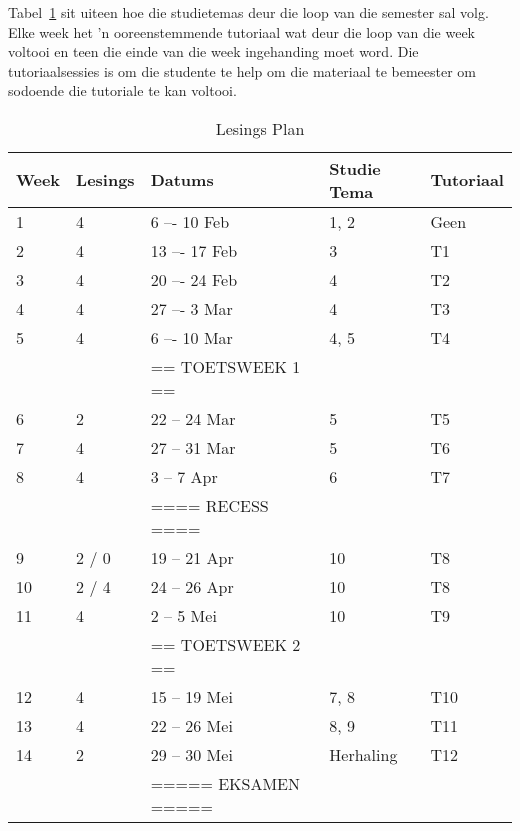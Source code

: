         Tabel~\ref{tab:lec_plan} sit uiteen hoe die studietemas deur die loop
        van die semester sal volg.  Elke week het 'n ooreenstemmende tutoriaal
        wat deur die loop van die week voltooi en teen die	einde van die week
        ingehanding moet word. Die tutoriaalsessies is om die studente te help
        om die materiaal te bemeester om sodoende die tutoriale te kan voltooi.

        \begin{table}[!h]
            \begin{center}
             \begin{tabular}{|l|l|l|l|l|}
                 \hline
                 {\bf Week} & {\bf Lesings} & {\bf Datums} & {\bf Studie Tema}
                 & {\bf Tutoriaal} \\
                 \hline
                 1  & 4     &  6 –- 10 Feb      & 1, 2  & Geen \\
                 2  & 4     & 13 –- 17 Feb      & 3     & T1 \\
                 3  & 4     & 20 –- 24 Feb      & 4     & T2 \\
                 4  & 4     & 27 –-  3 Mar      & 4     & T3 \\
                 5  & 4     &  6 –- 10 Mar      & 4, 5  & T4 \\
                    &       & == TOETSWEEK 1 == &       & \\
                 6  & 2     & 22 -- 24 Mar      & 5     & T5 \\
                 7  & 4     & 27 -- 31 Mar      & 5     & T6 \\
                 8  & 4     &  3 --  7 Apr      & 6     & T7 \\
                    &       & ==== RECESS ====  &       & \\
                 9  & 2 / 0 & 19 -- 21 Apr      & 10    & T8 \\
                 10 & 2 / 4 & 24 -- 26 Apr      & 10    & T8 \\
                 11 & 4     &  2 --  5 Mei      & 10    & T9 \\
                    &       & == TOETSWEEK 2 == &       & \\
                 12 & 4     & 15 -- 19 Mei      & 7, 8  & T10 \\
                 13 & 4     & 22 -- 26 Mei      & 8, 9  & T11 \\
                 14 & 2     & 29 -- 30 Mei      & Herhaling & T12 \\
                    &       & ===== EKSAMEN ===== &       & \\
                 \hline
             \end{tabular}
             \caption{Lesings Plan} \label{tab:lec_plan}
            \end{center}
        \end{table}


